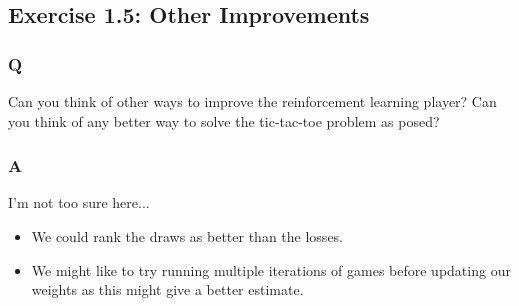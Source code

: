 \subsection{Exercise 1.5: Other Improvements}
\subsubsection{Q}
Can you think of other ways to improve the reinforcement learning player? Can you think of any better way to solve the tic-tac-toe problem as posed?

\subsubsection{A}
I'm not too sure here...
\begin{itemize}
    \item We could rank the draws as better than the losses.
    \item We might like to try running multiple iterations of games before updating our weights as this might give a better estimate.
\end{itemize}
